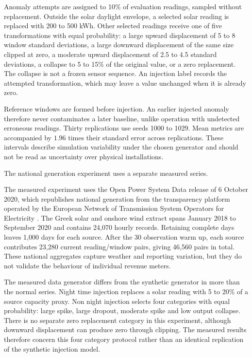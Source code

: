 \documentclass[11pt,a4paper]{article}
\begin{document}
Anomaly attempts are assigned to 10\% of evaluation readings, sampled without replacement. Outside the solar daylight envelope, a selected solar reading is replaced with 200 to 500 kWh. Other selected readings receive one of five transformations with equal probability: a large upward displacement of 5 to 8 window standard deviations, a large downward displacement of the same size clipped at zero, a moderate upward displacement of 2.5 to 4.5 standard deviations, a collapse to 5 to 15\% of the original value, or a zero replacement. The collapse is not a frozen sensor sequence. An injection label records the attempted transformation, which may leave a value unchanged when it is already zero.

Reference windows are formed before injection. An earlier injected anomaly therefore never contaminates a later baseline, unlike operation with undetected erroneous readings. Thirty replications use seeds 1000 to 1029. Mean metrics are accompanied by $1.96$ times their standard error across replications. These intervals describe simulation variability under the chosen generator and should not be read as uncertainty over physical installations.


The national generation experiment uses a separate measured series.


The measured experiment uses the Open Power System Data release of 6 October 2020, which republishes national generation from the transparency platform operated by the European Network of Transmission System Operators for Electricity \cite{opsd}. The Greek solar and onshore wind extract spans January 2018 to September 2020 and contains 24,070 hourly records. Retaining complete days leaves 1,000 days for each source. After the 30 observation warm up, each source contributes 23,280 current reading/window pairs, giving 46,560 pairs in total. These national aggregates capture weather and reporting variation, but they do not validate the behaviour of individual revenue meters.

The measured data generator differs from the synthetic generator in more than the normal series. Night time injection replaces a solar reading with 5 to 20\% of a source capacity proxy. Non night injection selects four categories with equal probability: large spike, large dropout, moderate spike and low output collapse. There is no separate zero replacement category in this experiment, although downward displacement can produce zero through clipping. The measured results therefore concern this four category protocol rather than an identical replication of the synthetic injection model.
\end{document}
